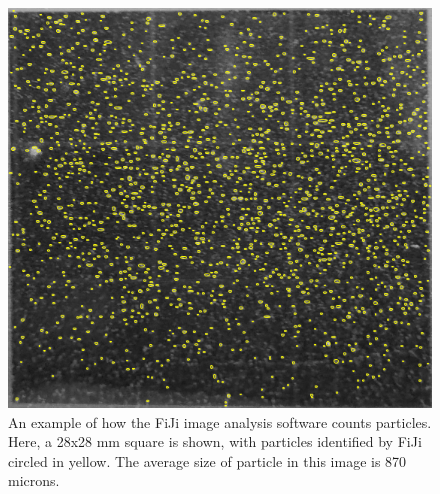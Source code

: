 \documentclass[fleqn,10pt]{SelfArx} %
\begin{document}
	\begin{figure}[h]
		\centering
		\includegraphics[width=1\linewidth]{Figures/ParticleCounting}
		\caption[FiJi Particle Counting]{An example of how the FiJi image analysis software counts particles. Here, a 28x28 mm square is shown, with particles identified by FiJi circled in yellow. The average size of particle in this image is 870 microns. }
		\label{fig:FiJiAnal}
	\end{figure}
	
\end{document}
